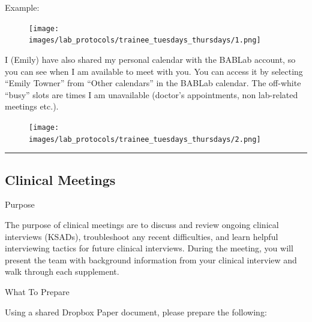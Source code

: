 \documentclass[
]{book}
\begin{document}
Example:

\begin{figure}
\centering
\texttt{[image: images/lab\_protocols/trainee\_tuesdays\_thursdays/1.png]}
\caption{}
\end{figure}

I (Emily) have also shared my personal calendar with the BABLab account, so you can see when I am available to meet with you. You can access it by selecting ``Emily Towner'' from ``Other calendars'' in the BABLab calendar. The off-white ``busy'' slots are times I am unavailable (doctor's appointments, non lab-related meetings etc.).

\begin{figure}
\centering
\texttt{[image: images/lab\_protocols/trainee\_tuesdays\_thursdays/2.png]}
\caption{}
\end{figure}

\begin{center}\rule{0.5\linewidth}{0.5pt}\end{center}

\hypertarget{clinical-meetings}{%
\subsection{Clinical Meetings}\label{clinical-meetings}}

Purpose

The purpose of clinical meetings are to discuss and review ongoing clinical interviews (KSADs), troubleshoot any recent difficulties, and learn helpful interviewing tactics for future clinical interviews. During the meeting, you will present the team with background information from your clinical interview and walk through each supplement.

What To Prepare

Using a shared Dropbox Paper document, please prepare the following:
\end{document}
